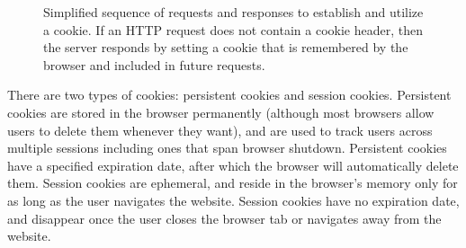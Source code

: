 \documentclass[11pt,twoside]{scrartcl}
\begin{document}
\begin{figure}
\centering
{}

\caption{\label{fig:cookiediagram} Simplified sequence of requests and responses to establish and utilize a cookie. If an HTTP request does not contain a cookie header, then the server responds by setting a cookie that is remembered by the browser and included in future requests.}
\end{figure}

There are two types of cookies: persistent cookies and session cookies. Persistent cookies are stored in the browser permanently (although most browsers allow users to delete them whenever they want), and are used to track users across multiple sessions including ones that span browser shutdown. Persistent cookies have a specified expiration date, after which the browser will automatically delete them. Session cookies are ephemeral, and reside in the browser's memory only for as long as the user navigates the website. Session cookies have no expiration date, and disappear once the user closes the browser tab or navigates away from the website.
\end{document}
